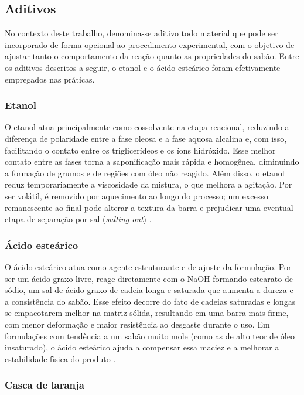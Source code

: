 \subsection{Aditivos}

No contexto deste trabalho, denomina-se aditivo todo material que pode ser incorporado de forma opcional ao procedimento experimental, com o objetivo de ajustar tanto o comportamento da reação quanto as propriedades do sabão. Entre os aditivos descritos a seguir, o etanol e o ácido esteárico foram efetivamente empregados nas práticas.

\subsubsection{Etanol}

O etanol atua principalmente como cossolvente na etapa reacional, reduzindo a diferença de polaridade entre a fase oleosa e a fase aquosa alcalina e, com isso, facilitando o contato entre os triglicerídeos e os íons hidróxido. Esse melhor contato entre as fases torna a saponificação mais rápida e homogênea, diminuindo a formação de grumos e de regiões com óleo não reagido. Além disso, o etanol reduz temporariamente a viscosidade da mistura, o que melhora a agitação. Por ser volátil, é removido por aquecimento ao longo do processo; um excesso remanescente ao final pode alterar a textura da barra e prejudicar uma eventual etapa de separação por sal (\textit{salting-out}) \cite{mabrouk2005soap}.

\subsubsection{Ácido esteárico}

O ácido esteárico atua como agente estruturante e de ajuste da formulação. Por ser um ácido graxo livre, reage diretamente com o NaOH formando estearato de sódio, um sal de ácido graxo de cadeia longa e saturada que aumenta a dureza e a consistência do sabão. Esse efeito decorre do fato de cadeias saturadas e longas se empacotarem melhor na matriz sólida, resultando em uma barra mais firme, com menor deformação e maior resistência ao desgaste durante o uso. Em formulações com tendência a um sabão muito mole (como as de alto teor de óleo insaturado), o ácido esteárico ajuda a compensar essa maciez e a melhorar a estabilidade física do produto \cite{alum2024saponification}.

\subsubsection{Casca de laranja}

